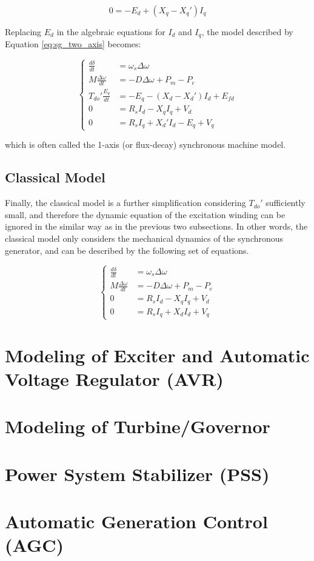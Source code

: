 \begin{equation*}
    0 = -E_d + (X_q - X_q')I_q
\end{equation*}

Replacing $E_d$ in the algebraic equations for $I_d$ and $I_q$, the model
described by Equation \ref{eq:sg_two_axis} becomes:

\begin{equation} \label{eq:sg_one_axis}
    \begin{cases}
        \frac{d\delta}{dt} &= \omega_s \Delta\omega\\
        M\frac{\Delta\omega}{dt} &= -D\Delta\omega + P_m - P_e\\
        T_{do}' \frac{E_q}{dt} &= -E_q - (X_d - X_d')I_d + E_{fd}\\
        0 &= R_s I_d - X_q I_q + V_d \\
        0 &= R_s I_q + X_d' I_d - E_q + V_q
    \end{cases}
\end{equation}

\noindent which is often called the 1-axis (or flux-decay) synchronous machine
model.

\subsection{Classical Model}

Finally, the classical model is a further simplification considering $T_{do}'$
sufficiently small, and therefore the dynamic equation of the excitation winding
can be ignored in the similar way as in the previous two subsections. In other
words, the classical model only considers the mechanical dynamics of the
synchronous generator, and can be described by the following set of equations.

\begin{equation} \label{eq:sg_classical}
    \begin{cases}
        \frac{d\delta}{dt} &= \omega_s \Delta\omega\\
        M\frac{\Delta\omega}{dt} &= -D\Delta\omega + P_m - P_e\\
        0 &= R_s I_d - X_q I_q + V_d \\
        0 &= R_s I_q + X_d I_d + V_q
    \end{cases}
\end{equation}

\section{Modeling of Exciter and Automatic Voltage Regulator (AVR)}
\section{Modeling of Turbine/Governor}

\section{Power System Stabilizer (PSS)}
\section{Automatic Generation Control (AGC)}